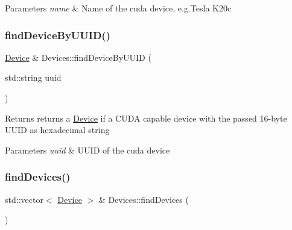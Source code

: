 \begin{DoxyParams}{Parameters}
{\em name} & Name of the cuda device, e.\+g.\textquotesingle{}Tesla K20c\textquotesingle{} \\
\hline
\end{DoxyParams}
\mbox{\label{classyacx_1_1_devices_afbeb807ea9fac2ba0be9c4fa812c5243}} 
\subsubsection{\texorpdfstring{find\+Device\+By\+U\+U\+I\+D()}{findDeviceByUUID()}}
{\footnotesize\ttfamily \hyperlink{classyacx_1_1_device}{Device} \& Devices\+::find\+Device\+By\+U\+U\+ID (\begin{DoxyParamCaption}\item[{std\+::string}]{uuid }\end{DoxyParamCaption})\hspace{0.3cm}{\ttfamily [static]}}

\begin{DoxyReturn}{Returns}
returns a \hyperlink{classyacx_1_1_device}{Device} if a C\+U\+DA capable device with the passed 16-\/byte U\+U\+ID as hexadecimal string 
\end{DoxyReturn}

\begin{DoxyParams}{Parameters}
{\em uuid} & U\+U\+ID of the cuda device \\
\hline
\end{DoxyParams}
\mbox{\label{classyacx_1_1_devices_aa1a44930c265be1c6593af6c42cd9c12}} 
\subsubsection{\texorpdfstring{find\+Devices()}{findDevices()}\hspace{0.1cm}{\footnotesize\ttfamily [1/2]}}
{\footnotesize\ttfamily std\+::vector$<$ \hyperlink{classyacx_1_1_device}{Device} $>$ \& Devices\+::find\+Devices (\begin{DoxyParamCaption}{ }\end{DoxyParamCaption})\hspace{0.3cm}{\ttfamily [static]}}

